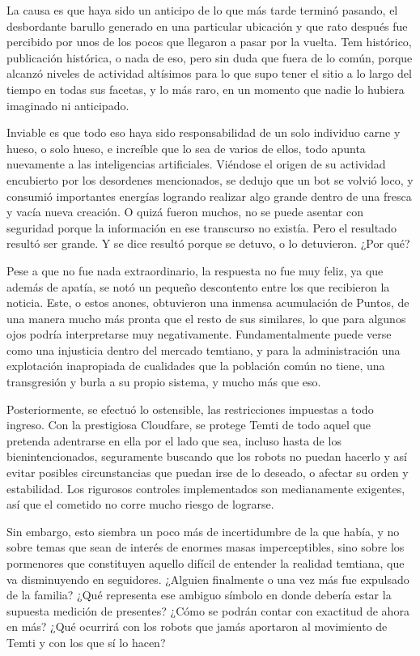 \documentclass[
  spanish,
]{book}
\begin{document}
La causa es que haya sido un anticipo de lo que más tarde terminó pasando, el desbordante barullo generado en una particular ubicación y que rato después fue percibido por unos de los pocos que llegaron a pasar por la vuelta. Tem histórico, publicación histórica, o nada de eso, pero sin duda que fuera de lo común, porque alcanzó niveles de actividad altísimos para lo que supo tener el sitio a lo largo del tiempo en todas sus facetas, y lo más raro, en un momento que nadie lo hubiera imaginado ni anticipado.

Inviable es que todo eso haya sido responsabilidad de un solo individuo carne y hueso, o solo hueso, e increíble que lo sea de varios de ellos, todo apunta nuevamente a las inteligencias artificiales. Viéndose el origen de su actividad encubierto por los desordenes mencionados, se dedujo que un bot se volvió loco, y consumió importantes energías logrando realizar algo grande dentro de una fresca y vacía nueva creación. O quizá fueron muchos, no se puede asentar con seguridad porque la información en ese transcurso no existía. Pero el resultado resultó ser grande. Y se dice resultó porque se detuvo, o lo detuvieron. ¿Por qué?

Pese a que no fue nada extraordinario, la respuesta no fue muy feliz, ya que además de apatía, se notó un pequeño descontento entre los que recibieron la noticia. Este, o estos anones, obtuvieron una inmensa acumulación de Puntos, de una manera mucho más pronta que el resto de sus similares, lo que para algunos ojos podría interpretarse muy negativamente. Fundamentalmente puede verse como una injusticia dentro del mercado temtiano, y para la administración una explotación inapropiada de cualidades que la población común no tiene, una transgresión y burla a su propio sistema, y mucho más que eso.

Posteriormente, se efectuó lo ostensible, las restricciones impuestas a todo ingreso. Con la prestigiosa Cloudfare, se protege Temti de todo aquel que pretenda adentrarse en ella por el lado que sea, incluso hasta de los bienintencionados, seguramente buscando que los robots no puedan hacerlo y así evitar posibles circunstancias que puedan irse de lo deseado, o afectar su orden y estabilidad. Los rigurosos controles implementados son medianamente exigentes, así que el cometido no corre mucho riesgo de lograrse.

Sin embargo, esto siembra un poco más de incertidumbre de la que había, y no sobre temas que sean de interés de enormes masas imperceptibles, sino sobre los pormenores que constituyen aquello difícil de entender la realidad temtiana, que va disminuyendo en seguidores. ¿Alguien finalmente o una vez más fue expulsado de la familia? ¿Qué representa ese ambiguo símbolo en donde debería estar la supuesta medición de presentes? ¿Cómo se podrán contar con exactitud de ahora en más? ¿Qué ocurrirá con los robots que jamás aportaron al movimiento de Temti y con los que sí lo hacen?
\end{document}
